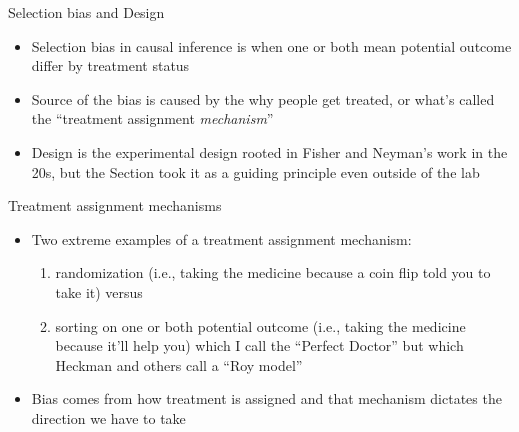 \documentclass{beamer}
\begin{document}
\begin{frame}{Selection bias and Design}

\begin{itemize}
\item Selection bias in causal inference is when one or both mean potential outcome differ by treatment status
\item Source of the bias is caused by the why people get treated, or what's called the ``treatment assignment \emph{mechanism}''
\item Design is the experimental design rooted in Fisher and Neyman's work in the 20s, but the Section took it as a guiding principle even outside of the lab


\end{itemize}

\end{frame}

\begin{frame}{Treatment assignment mechanisms}

\begin{itemize}
\item Two extreme examples of a treatment assignment mechanism: 
	\begin{enumerate}
	\item randomization (i.e., taking the medicine because a coin flip told you to take it) versus 
	\item sorting on one or both potential outcome (i.e., taking the medicine because it'll help you) which I call the ``Perfect Doctor'' but which Heckman and others call a ``Roy model''
	\end{enumerate}
\item Bias comes from how treatment is assigned and that mechanism dictates the direction we have to take

\end{itemize}

\end{frame}
\end{document}
